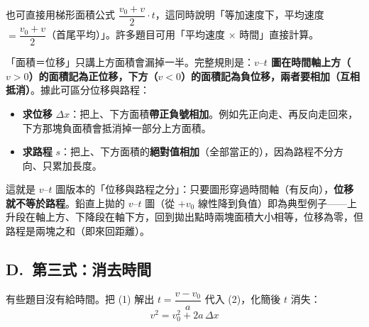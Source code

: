 \documentclass[11pt]{article}
\begin{document}
也可直接用梯形面積公式 $\dfrac{v_0+v}{2}\cdot t$，這同時說明「等加速度下，平均速度 $=\dfrac{v_0+v}{2}$（首尾平均）」。許多題目可用「平均速度 × 時間」直接計算。

「面積＝位移」只講上方面積會漏掉一半。完整規則是：\textbf{$v\text{–}t$ 圖在時間軸上方（$v>0$）的面積記為正位移，下方（$v<0$）的面積記為負位移，兩者要相加（互相抵消）}。據此可區分位移與路程：
\begin{itemize}\setlength{\itemsep}{2pt}
\item \textbf{求位移} $\Delta x$：把上、下方面積\textbf{帶正負號相加}。例如先正向走、再反向走回來，下方那塊負面積會抵消掉一部分上方面積。
\item \textbf{求路程} $s$：把上、下方面積的\textbf{絕對值相加}（全部當正的），因為路程不分方向、只累加長度。
\end{itemize}
這就是 $v\text{–}t$ 圖版本的「位移與路程之分」：只要圖形穿過時間軸（有反向），\textbf{位移就不等於路程}。鉛直上拋的 $v\text{–}t$ 圖（從 $+v_0$ 線性降到負值）即為典型例子——上升段在軸上方、下降段在軸下方，回到拋出點時兩塊面積大小相等，位移為零，但路程是兩塊之和（即來回距離）。


\subsection*{\sffamily D.\ 第三式：消去時間}

有些題目沒有給時間。把 (1) 解出 $t=\dfrac{v-v_0}{a}$ 代入 (2)，化簡後 $t$ 消失：
\begin{equation}\boxed{\,v^2 = v_0^2 + 2 a\,\Delta x\,}\tag{3}\end{equation}
\end{document}

